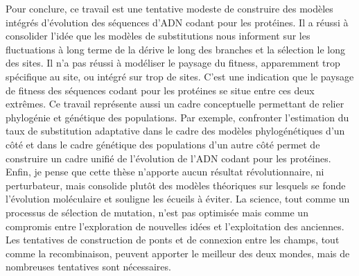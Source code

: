 Pour conclure, ce travail est une tentative modeste de construire des modèles intégrés d'évolution des séquences d'ADN codant pour les protéines.
Il a réussi à consolider l'idée que les modèles de substitutions nous informent sur les fluctuations à long terme de la dérive le long des branches et la sélection le long des sites.
Il n'a pas réussi à modéliser le paysage du fitness, apparemment trop spécifique au site, ou intégré sur trop de sites.
C'est une indication que le paysage de fitness des séquences codant pour les protéines se situe entre ces deux extrêmes.
Ce travail représente aussi un cadre conceptuelle permettant de  relier phylogénie et génétique des populations.
Par exemple, confronter l'estimation du taux de substitution adaptative dans le cadre des modèles phylogénétiques d’un côté et dans le cadre génétique des populations d’un autre côté permet de construire un cadre unifié de l'évolution de l'ADN codant pour les protéines.
Enfin, je pense que cette thèse n'apporte aucun résultat révolutionnaire, ni perturbateur, mais consolide plutôt des modèles théoriques sur lesquels se fonde l'évolution moléculaire et souligne les écueils à éviter.
La science, tout comme un processus de sélection de mutation, n'est pas optimisée mais comme un compromis entre l'exploration de nouvelles idées et l'exploitation des anciennes.
Les tentatives de construction de ponts et de connexion entre les champs, tout comme la recombinaison, peuvent apporter le meilleur des deux mondes, mais de nombreuses tentatives sont nécessaires.
